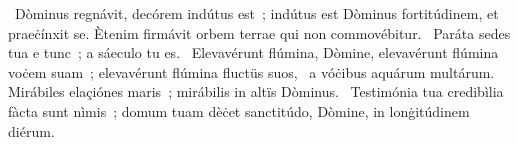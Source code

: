 \psalmChapterWithInscription{}
{ }
{%
~Dòminus regnávit, decórem indútus est~; indútus est Dòminus fortitúdinem, et praeċínxit se. Ètenim firmávit orbem terrae qui non commovébitur. 
~Paráta sedes tua e tunc~; a sáeculo tu es. 
~Elevavérunt flúmina, Dòmine, elevavérunt flúmina voċem suam~; elevavérunt flúmina fluctüs suos, 
~a vóċibus aquárum multárum. Mirábiles elaçiónes maris~; mirábilis in altïs Dòminus. 
~Testimónia tua credibìlia fàcta sunt nìmis~; domum tuam dèċet sanctitúdo, Dòmine, in lonġitúdinem diérum. 
}
